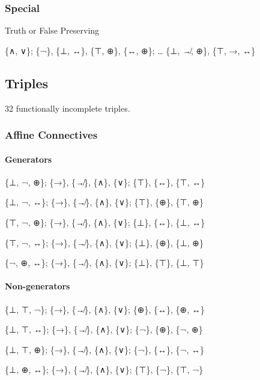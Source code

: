 \hypertarget{special}{%
\subsubsection{Special}\label{special}}

Truth or False Preserving

\{∧, ∨\}; \{¬\}, \{⊥, ↔\}, \{⊤, ⊕\}, \{↔, ⊕\}; \ldots{} \{⊥, ↛, ⊕\},
\{⊤, →, ↔\}

\hypertarget{triples-1}{%
\subsection{Triples}\label{triples-1}}

32 functionally incomplete triples.

\hypertarget{affine-connectives}{%
\subsubsection{Affine Connectives}\label{affine-connectives}}

\hypertarget{generators-1}{%
\paragraph{Generators}\label{generators-1}}

\{⊥, ¬, ⊕\}; \{→\}, \{↛\}, \{∧\}, \{∨\}; \{⊤\}, \{↔\}, \{⊤, ↔\}

\{⊥, ¬, ↔\}; \{→\}, \{↛\}, \{∧\}, \{∨\}; \{⊤\}, \{⊕\}, \{⊤, ⊕\}

\{⊤, ¬, ⊕\}; \{→\}, \{↛\}, \{∧\}, \{∨\}; \{⊥\}, \{↔\}, \{⊥, ↔\}

\{⊤, ¬, ↔\}; \{→\}, \{↛\}, \{∧\}, \{∨\}; \{⊥\}, \{⊕\}, \{⊥, ⊕\}

\{¬, ⊕, ↔\}; \{→\}, \{↛\}, \{∧\}, \{∨\}; \{⊥\}, \{⊤\}, \{⊥, ⊤\}

\hypertarget{non-generators-1}{%
\paragraph{Non-generators}\label{non-generators-1}}

\{⊥, ⊤, ¬\}; \{→\}, \{↛\}, \{∧\}, \{∨\}; \{⊕\}, \{↔\}, \{⊕, ↔\}

\{⊥, ⊤, ↔\}; \{→\}, \{↛\}, \{∧\}, \{∨\}; \{¬\}, \{⊕\}, \{¬, ⊕\}

\{⊥, ⊤, ⊕\}; \{→\}, \{↛\}, \{∧\}, \{∨\}; \{¬\}, \{↔\}, \{¬, ↔\}

\{⊥, ⊕, ↔\}; \{→\}, \{↛\}, \{∧\}, \{∨\}; \{⊤\}, \{¬\}, \{⊤, ¬\}

